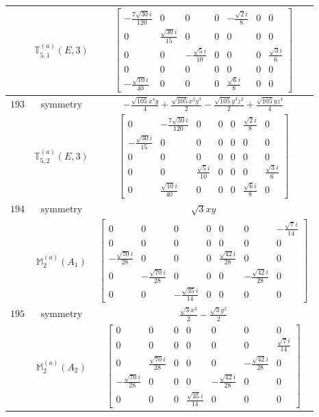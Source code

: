 \documentclass[fleqn,8pt,landscape]{jsarticle}
\begin{document}
\begin{longtable}{ccc}
$  $ & $ \mathbb{T}_{5,1}^{(a)}(E,3) $ & $ \begin{bmatrix} - \frac{7 \sqrt{30} i}{120} & 0 & 0 & 0 & - \frac{\sqrt{2} i}{8} & 0 & 0 \\ 0 & \frac{\sqrt{30} i}{15} & 0 & 0 & 0 & 0 & 0 \\ 0 & 0 & - \frac{\sqrt{5} i}{10} & 0 & 0 & 0 & \frac{\sqrt{3} i}{6} \\ 0 & 0 & 0 & 0 & 0 & 0 & 0 \\ - \frac{\sqrt{10} i}{40} & 0 & 0 & 0 & \frac{\sqrt{6} i}{8} & 0 & 0 \end{bmatrix} $ \\ \hline
$ 193 $ & $ \text{symmetry} $ & $ - \frac{\sqrt{105} x^{4} y}{4} + \frac{\sqrt{105} x^{2} y^{3}}{2} - \frac{\sqrt{105} y^{3} z^{2}}{2} + \frac{\sqrt{105} y z^{4}}{4} $ \\
$  $ & $ \mathbb{T}_{5,2}^{(a)}(E,3) $ & $ \begin{bmatrix} 0 & - \frac{7 \sqrt{30} i}{120} & 0 & 0 & 0 & \frac{\sqrt{2} i}{8} & 0 \\ - \frac{\sqrt{30} i}{15} & 0 & 0 & 0 & 0 & 0 & 0 \\ 0 & 0 & 0 & 0 & 0 & 0 & 0 \\ 0 & 0 & \frac{\sqrt{5} i}{10} & 0 & 0 & 0 & \frac{\sqrt{3} i}{6} \\ 0 & \frac{\sqrt{10} i}{40} & 0 & 0 & 0 & \frac{\sqrt{6} i}{8} & 0 \end{bmatrix} $ \\ \hline
$ 194 $ & $ \text{symmetry} $ & $ \sqrt{3} x y $ \\
$  $ & $ \mathbb{M}_{2}^{(a)}(A_{1}) $ & $ \begin{bmatrix} 0 & 0 & 0 & 0 & 0 & 0 & - \frac{\sqrt{7} i}{14} \\ 0 & 0 & 0 & 0 & 0 & 0 & 0 \\ - \frac{\sqrt{70} i}{28} & 0 & 0 & 0 & \frac{\sqrt{42} i}{28} & 0 & 0 \\ 0 & - \frac{\sqrt{70} i}{28} & 0 & 0 & 0 & - \frac{\sqrt{42} i}{28} & 0 \\ 0 & 0 & - \frac{\sqrt{35} i}{14} & 0 & 0 & 0 & 0 \end{bmatrix} $ \\ \hline
$ 195 $ & $ \text{symmetry} $ & $ \frac{\sqrt{3} x^{2}}{2} - \frac{\sqrt{3} y^{2}}{2} $ \\
$  $ & $ \mathbb{M}_{2}^{(a)}(A_{2}) $ & $ \begin{bmatrix} 0 & 0 & 0 & 0 & 0 & 0 & 0 \\ 0 & 0 & 0 & 0 & 0 & 0 & \frac{\sqrt{7} i}{14} \\ 0 & \frac{\sqrt{70} i}{28} & 0 & 0 & 0 & - \frac{\sqrt{42} i}{28} & 0 \\ - \frac{\sqrt{70} i}{28} & 0 & 0 & 0 & - \frac{\sqrt{42} i}{28} & 0 & 0 \\ 0 & 0 & 0 & \frac{\sqrt{35} i}{14} & 0 & 0 & 0 \end{bmatrix} $ \\ \hline

\end{longtable}
\end{document}
